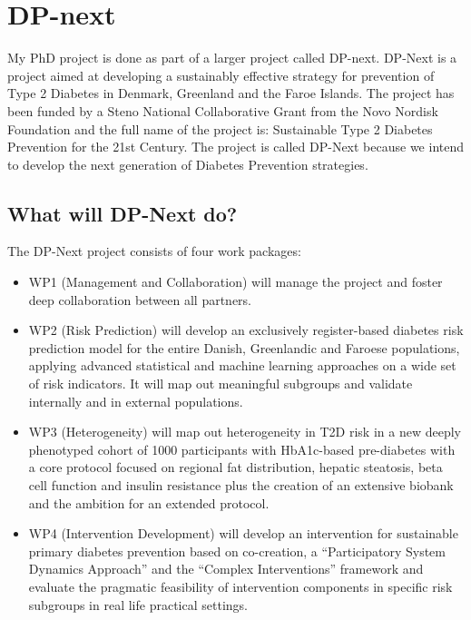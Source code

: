 \documentclass[11pt]{article}
\author{Hjalte Søberg Mikkelsen}
\date{\today}
\title{}
\begin{document}
\tableofcontents


\section{DP-next}
\label{sec:org8903715}
My PhD project is done as part of a larger project called DP-next. DP-Next is a project aimed at
developing a sustainably effective strategy for prevention of Type 2 Diabetes in Denmark, Greenland
and the Faroe Islands. The project has been funded by a Steno National Collaborative Grant from the
Novo Nordisk Foundation and the full name of the
project is: Sustainable Type 2 Diabetes Prevention for the 21st Century. The project is called DP-Next
because we intend to develop the next generation of Diabetes Prevention strategies.

\subsection{What will DP-Next do?}
\label{sec:org0944534}
The DP-Next project consists of four work packages:

\begin{itemize}
\item WP1 (Management and Collaboration) will manage the project and foster deep collaboration between all
partners.
\item WP2 (Risk Prediction) will develop an exclusively register-based diabetes risk prediction model for
the entire Danish, Greenlandic and Faroese populations, applying advanced statistical and machine
learning approaches on a wide set of risk indicators. It will map out meaningful subgroups and
validate internally and in external populations.
\item WP3 (Heterogeneity) will map out heterogeneity in T2D risk in a new deeply phenotyped cohort of 1000
participants with HbA1c-based pre-diabetes with a core protocol focused on regional fat distribution,
 hepatic steatosis, beta cell function and insulin resistance plus the creation of an extensive
 biobank and the ambition for an extended protocol.
\item WP4 (Intervention Development) will develop an intervention for sustainable primary diabetes
prevention based on co-creation, a “Participatory System Dynamics Approach” and the “Complex
Interventions” framework and evaluate the pragmatic feasibility of intervention components in
specific risk subgroups in real life practical settings.
\end{itemize}
\end{document}
